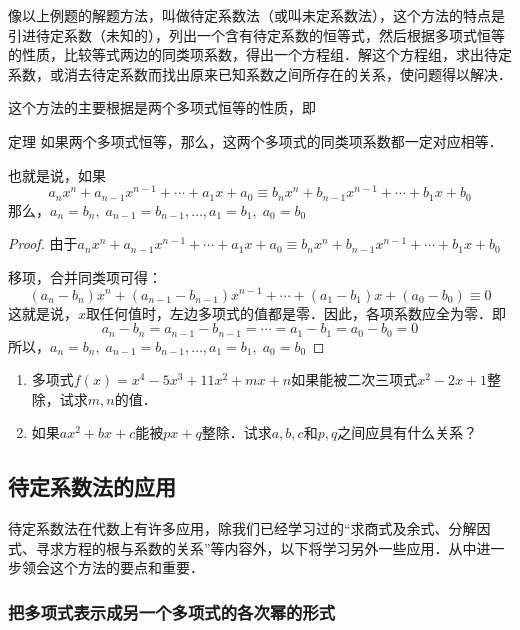 像以上例题的解题方法，叫做待定系数法（或叫未定系数法），这个方法的特点是引进待定系数（未知的），列出一个含有待定系数的恒等式，然后根据多项式恒等的性质，比较等式两边的同类项系数，得出一个方程组．解这个方程组，求出待定系数，或消去待定系数而找出原来已知系数之间所存在的关系，使问题得以解决．

这个方法的主要根据是两个多项式恒等的性质，即

\begin{blk}{定理}
    如果两个多项式恒等，那么，这两个多项式的同类项系数都一定对应相等．
\end{blk}

也就是说，如果 
$$a_nx^n+a_{n-1}x^{n-1}+\cdots+a_1x+a_0\equiv b_nx^n+b_{n-1}x^{n-1}+\cdots+b_1x+b_0$$
那么，$a_n=b_n,\; a_{n-1}=b_{n-1},\ldots, a_1=b_1,\; a_0=b_0$

\begin{proof}
由于$a_nx^n+a_{n-1}x^{n-1}+\cdots+a_1x+a_0\equiv b_nx^n+b_{n-1}x^{n-1}+\cdots+b_1x+b_0$

移项，合并同类项可得：
\[(a_n-b_n)x^n+(a_{n-1}-b_{n-1})x^{n-1}+\cdots + (a_1-b_1)x+(a_0-b_0)\equiv 0\]
这就是说，$x$取任何值时，左边多项式的值都是零．因此，各项系数应全为零．即
\[a_n-b_n=a_{n-1}-b_{n-1}=\cdots=a_1-b_1=a_0-b_0=0\]
所以，$a_n=b_n,\; a_{n-1}=b_{n-1},\ldots, a_1=b_1,\; a_0=b_0$
\end{proof}

\begin{ex}
\begin{enumerate}
\item  多项式$f(x)=x^4-5x^3+11x^2+mx+n$如果能被二次三项式$x^2-2x+1$整除，试求$m,n$的值．
\item  如果$ax^2+bx+c$能被$px+q$整除．试求$a,b,c$和$p,q$之间应具有什么关系？
\end{enumerate}

\end{ex}

\subsection{待定系数法的应用}
待定系数法在代数上有许多应用，除我们已经学习过的“求商式及余式、分解因式、寻求方程的根与系数的关系”等内容外，以下将学习另外一些应用．从中进一步领会这个方法的要点和重要．

\subsubsection{把多项式表示成另一个多项式的各次幂的形式}

